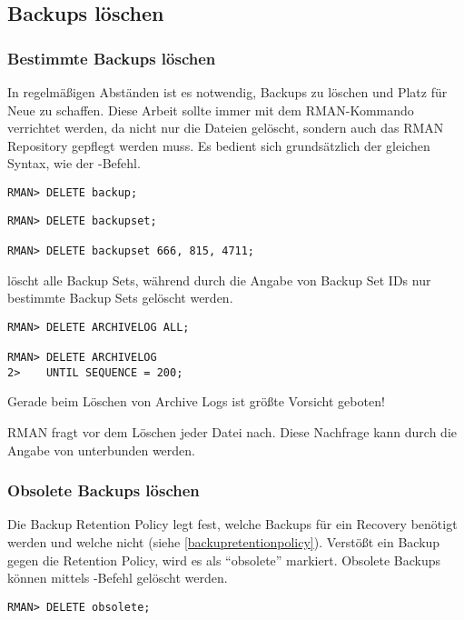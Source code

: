       \subsection{Backups löschen}
        \label{deletingbackups}
        \subsubsection{Bestimmte Backups löschen}
          In regelmäßigen Abständen ist es notwendig, Backups zu löschen und Platz für Neue zu schaffen. Diese Arbeit sollte immer mit dem RMAN-Kommando  verrichtet werden, da nicht nur die Dateien gelöscht, sondern auch das RMAN Repository gepflegt werden muss. Es bedient sich grundsätzlich der gleichen Syntax, wie der -Befehl.
          \begin{lstlisting}[caption=Alle vorhandenen Backups löschen,label=admin1338,language=rman]
RMAN> DELETE backup;
          \end{lstlisting}
          \begin{lstlisting}[caption=Nur Backup Sets löschen,label=admin1339,language=rman]
RMAN> DELETE backupset;

RMAN> DELETE backupset 666, 815, 4711;
          \end{lstlisting}
           löscht alle Backup Sets, während durch die Angabe von Backup Set IDs nur bestimmte Backup Sets gelöscht werden.
          \begin{lstlisting}[caption=Archive Logs löschen,label=admin1340,language=rman]
RMAN> DELETE ARCHIVELOG ALL;

RMAN> DELETE ARCHIVELOG
2>    UNTIL SEQUENCE = 200;
          \end{lstlisting}
          \begin{merke}
            Gerade beim Löschen von Archive Logs ist größte Vorsicht geboten!
          \end{merke}
          RMAN fragt vor dem Löschen jeder Datei nach. Diese Nachfrage kann durch die Angabe von  unterbunden werden.
        \subsubsection{Obsolete Backups löschen}
          Die Backup Retention Policy legt fest, welche Backups für ein Recovery benötigt werden und welche nicht (siehe \ref{backupretentionpolicy}). Verstößt ein Backup gegen die Retention Policy, wird es als \enquote{obsolete} markiert. Obsolete Backups können mittels -Befehl gelöscht werden.
          \begin{lstlisting}[caption=Obsolete Backups löschen,label=admin1341,language=rman]
RMAN> DELETE obsolete;
          \end{lstlisting}
